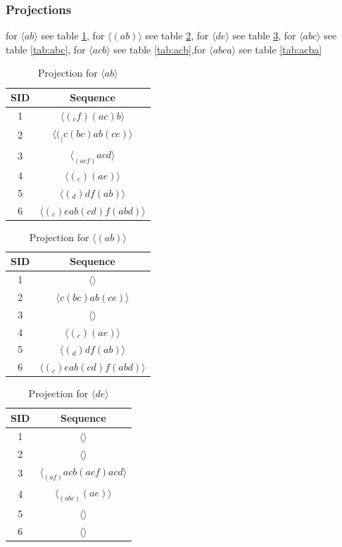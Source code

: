 \documentclass[11pt]{article}
\begin{document}
\subsubsection{Projections }
for $\langle ab \rangle$ see table \ref{tab:ab}, for $\langle (ab) \rangle$ see table \ref{tab:(ab)}, for $\langle de \rangle$ see table \ref{tab:de}, for $\langle abc \rangle$ see table \ref{tab:abc}, for $\langle acb \rangle$ see table \ref{tab:acb},for $\langle abca \rangle$ see table \ref{tab:acba}    
\begin{table}[]
    \centering
    \begin{tabular}{|c|c|} \hline
       SID  & Sequence  \\ \hline
       1 & $\langle (_cf)(ac)b \rangle$ \\ \hline
       2 & $\langle (_)c(bc)ab(ce) \rangle$ \\ \hline
       3 & $\langle _(acf)acd \rangle$ \\ \hline
       4 & $\langle (_c)(ae) \rangle$ \\ \hline
       5 & $\langle (_d)df(ab) \rangle$\\ \hline
       6 & $\langle (_c)eab(cd)f(abd) \rangle$ \\ \hline
    \end{tabular}
    \caption{Projection for $\langle ab \rangle$}
    \label{tab:ab}
\end{table}
\begin{table}[]
    \centering
    \begin{tabular}{|c|c|} \hline
       SID  & Sequence  \\ \hline
       1 & $\langle  \rangle$ \\ \hline
       2 & $\langle c(bc)ab(ce) \rangle$ \\ \hline
       3 & $\langle  \rangle$ \\ \hline
       4 & $\langle (_c)(ae) \rangle$ \\ \hline
       5 & $\langle (_d)df(ab) \rangle$\\ \hline
       6 & $\langle (_c)eab(cd)f(abd) \rangle$ \\ \hline
    \end{tabular}
    \caption{Projection for $\langle (ab) \rangle$}
    \label{tab:(ab)}
\end{table}
\begin{table}[]
    \centering
    \begin{tabular}{|c|c|} \hline
       SID  & Sequence  \\ \hline
       1 & $\langle  \rangle$\\ \hline
       2 & $\langle  \rangle$ \\ \hline
       3 & $\langle _(af)acb(acf)acd \rangle$ \\ \hline
       4 & $\langle _(abc)(ae) \rangle$ \\ \hline
       5 & $\langle  \rangle$\\ \hline
       6 & $\langle  \rangle$ \\ \hline
    \end{tabular}
    \caption{Projection for $\langle de \rangle$}
    \label{tab:de}
\end{table}
\end{document}
